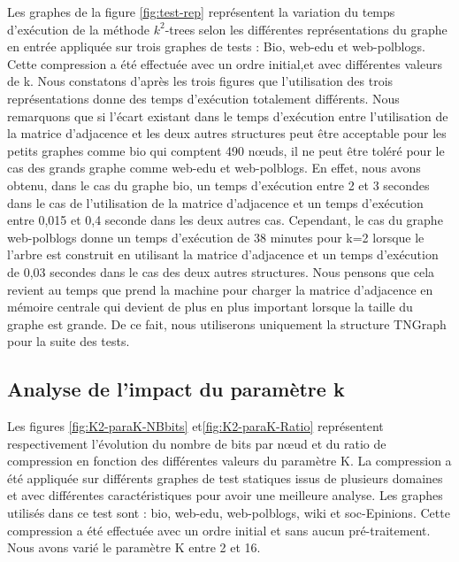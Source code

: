 Les graphes de la figure  \ref{fig:test-rep} représentent la variation du temps d'exécution de la méthode $k^2$-trees selon les différentes représentations du graphe en entrée appliquée sur trois graphes de tests : Bio, web-edu et web-polblogs. Cette compression a été effectuée avec un ordre initial,et avec différentes valeurs de k. 
Nous constatons d'après les trois figures que l'utilisation des trois représentations donne des temps d'exécution totalement différents. Nous remarquons que si l'écart existant dans le temps d'exécution  entre l'utilisation de la matrice d'adjacence  et les deux autres structures peut être acceptable pour les petits graphes comme bio qui comptent 490 nœuds, il ne peut être toléré pour le cas des grands graphe comme web-edu et web-polblogs.
En effet, nous avons obtenu, dans le cas du graphe bio, un temps d'exécution entre 2 et 3 secondes dans le cas de l'utilisation de la matrice d'adjacence et un temps d'exécution entre 0,015 et 0,4 seconde dans les deux autres cas. Cependant, le cas du graphe web-polblogs donne un temps d'exécution de 38 minutes pour k=2 lorsque le l'arbre est construit en utilisant la matrice d'adjacence et un temps d'exécution de 0,03 secondes dans le cas des deux autres structures. Nous pensons que cela revient au temps que prend la machine pour charger la matrice d'adjacence en mémoire centrale qui devient de plus en plus important lorsque la taille du graphe est grande. De ce fait, nous utiliserons uniquement la structure TNGraph pour la suite des tests.

			\subsection{Analyse de l'impact du paramètre k}
			Les figures \ref{fig:K2-paraK-NBbits} et\ref{fig:K2-paraK-Ratio} représentent respectivement l'évolution du nombre de bits par nœud et du ratio de compression en fonction des différentes valeurs du paramètre K. La compression a été appliquée sur différents graphes de test statiques issus de plusieurs domaines et avec différentes caractéristiques pour avoir une meilleure analyse. Les graphes utilisés dans ce test sont : bio, web-edu, web-polblogs, wiki et soc-Epinions. Cette compression a été effectuée avec un ordre initial et sans aucun pré-traitement.
 Nous avons varié le paramètre K entre 2 et 16.
			
